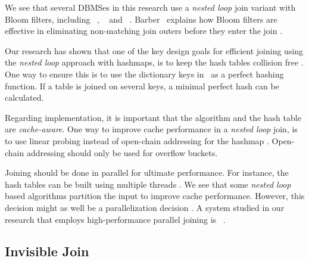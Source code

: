 We see that several DBMSes in this research use a \textit{nested loop} join variant with Bloom filters, including \oracle~\cite{Lahiri2015-mz}, \ibm~\cite{Raman2013-em} and \blink~\cite{Raman2008-gi}. Barber \ea~explains how Bloom filters are effective in eliminating non-matching join outers before they enter the join \cite{Barber2014-ey}.

Our research has shown that one of the key design goals for efficient joining using the \textit{nested loop} approach with hashmaps, is to keep the hash tables collision free \cite{Raman2008-gi, Raman2013-em}. One way to ensure this is to use the dictionary keys in \de~as a perfect hashing function. If a table is joined on several keys, a minimal perfect hash can be calculated.

Regarding implementation, it is important that the algorithm and the hash table are \textit{cache-aware}. One way to improve cache performance in a \textit{nested loop} join, is to use linear probing instead of open-chain addressing for the hashmap \cite{Raman2008-gi}. Open-chain addressing should only be used for overflow buckets.

Joining should be done in parallel for ultimate performance. For instance, the hash tables can be built using multiple threads \cite{Barber2014-ey}. We see that some \textit{nested loop} based algorithms partition the input to improve cache performance. However, this decision might as well be a parallelization decision \cite{Neumann2011-uq}. A system studied in our research that employs high-performance parallel joining is \ibm~\cite{Raman2013-em}.

\subsection{Invisible Join}
\label{sub:Invisible Join}

